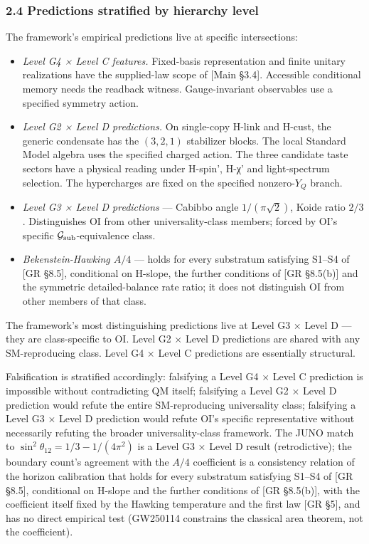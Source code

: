 \documentclass[
]{article}
\providecommand{\tightlist}{%
  \setlength{\itemsep}{0pt}\setlength{\parskip}{0pt}}
\begin{document}
\hypertarget{predictions-stratified-by-hierarchy-level}{%
\subsubsection{2.4 Predictions stratified by hierarchy
level}\label{predictions-stratified-by-hierarchy-level}}

The framework's empirical predictions live at specific intersections:

\begin{itemize}
\tightlist
\item
  \emph{Level G4 × Level C features.} Fixed-basis representation and
  finite unitary realizations have the supplied-law scope of {[}Main
  §3.4{]}. Accessible conditional memory needs the readback witness.
  Gauge-invariant observables use a specified symmetry action.
\item
  \emph{Level G2 × Level D predictions.} On single-copy H-link and
  H-cust, the generic condensate has the \((3,2,1)\) stabilizer blocks.
  The local Standard Model algebra uses the specified charged action.
  The three candidate taste sectors have a physical reading under
  H-spin', H-χ' and light-spectrum selection. The hypercharges are fixed
  on the specified nonzero-\(Y_Q\) branch.
\item
  \emph{Level G3 × Level D predictions} --- Cabibbo angle
  \(1/(\pi\sqrt{2})\), Koide ratio \(2/3\). Distinguishes OI from other
  universality-class members; forced by OI's specific
  \(\mathcal{G}_{\rm sub}\)-equivalence class.
\item
  \emph{Bekenstein-Hawking \(A/4\)} --- holds for every substratum
  satisfying S1--S4 of {[}GR §8.5{]}, conditional on H-slope, the
  further conditions of {[}GR §8.5(b){]} and the symmetric
  detailed-balance rate ratio; it does not distinguish OI from other
  members of that class.
\end{itemize}

The framework's most distinguishing predictions live at Level G3 × Level
D --- they are class-specific to OI. Level G2 × Level D predictions are
shared with any SM-reproducing class. Level G4 × Level C predictions are
essentially structural.

Falsification is stratified accordingly: falsifying a Level G4 × Level C
prediction is impossible without contradicting QM itself; falsifying a
Level G2 × Level D prediction would refute the entire SM-reproducing
universality class; falsifying a Level G3 × Level D prediction would
refute OI's specific representative without necessarily refuting the
broader universality-class framework. The JUNO match to
\(\sin^2\theta_{12} = 1/3 - 1/(4\pi^2)\) is a Level G3 × Level D result
(retrodictive); the boundary count's agreement with the \(A/4\)
coefficient is a consistency relation of the horizon calibration that
holds for every substratum satisfying S1--S4 of {[}GR §8.5{]},
conditional on H-slope and the further conditions of {[}GR §8.5(b){]},
with the coefficient itself fixed by the Hawking temperature and the
first law {[}GR §5{]}, and has no direct empirical test (GW250114
constrains the classical area theorem, not the coefficient).
\end{document}
